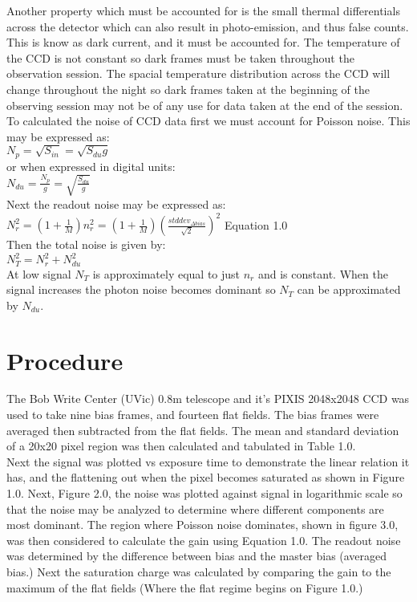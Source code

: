 \documentclass{article}
\begin{document}
Another property which must be accounted for is the small thermal differentials across the detector which can also result in photo-emission, and thus false counts. This is know as dark current, and it must be accounted for. The temperature of the CCD is not constant so dark frames must be taken throughout the observation session. The spacial temperature distribution across the CCD will change throughout the night so dark frames taken at the beginning of the observing session may not be of any use for data taken at the end of the session.\\

To calculated the noise of CCD data first we must account for Poisson noise. This may be expressed as:\\

$N_p=\sqrt{S_{in}}=\sqrt{S_{du}g}$\\

or when expressed in digital units:\\

$N_{du}=\frac{N_p}{g}=\sqrt{\frac{S_{du}}{g}}$\\

Next the readout noise may be expressed as:\\

$N^2_r=(1+\frac{1}{M})n^2_r=(1+\frac{1}{M})(\frac{stddev_{\Delta bias}}{\sqrt{2}})^2$ Equation 1.0\\

Then the total noise is given by:\\

$N_T^2=N_r^2+N_{du}^2$\\

At low signal $N_T$ is approximately equal to just $n_r$ and is constant. When the signal increases the photon noise becomes dominant so $N_T$ can be approximated by $N_{du}$.
\section{Procedure}
The Bob Write Center (UVic) 0.8m telescope and it's PIXIS 2048x2048 CCD was used to take nine bias frames, and fourteen flat fields. The bias frames were averaged then subtracted from the flat fields. The mean and standard deviation of a 20x20 pixel region was then calculated and tabulated in Table 1.0.\\

Next the signal was plotted vs exposure time to demonstrate the linear relation it has, and the flattening out when the pixel becomes saturated as shown in Figure 1.0. Next, Figure 2.0, the noise was plotted against signal in logarithmic scale so that the noise may be analyzed to determine where different components are most dominant. The region where Poisson noise dominates, shown in figure 3.0, was then considered to calculate the gain using Equation 1.0. The readout noise was determined by the difference between bias and the master bias (averaged bias.) Next the saturation charge was calculated by comparing the gain to the maximum of the flat fields (Where the flat regime begins on Figure 1.0.)\\
\end{document}
